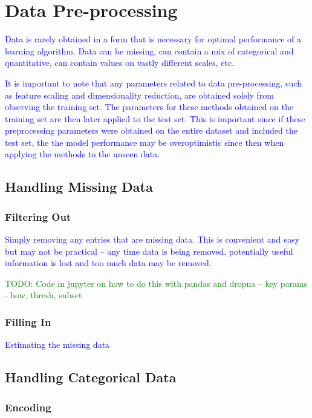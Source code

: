 \section{Data Pre-processing}

\textcolor{blue}{Data is rarely obtained in a form that is necessary for optimal performance of a learning algorithm. Data can be missing, can contain a mix of categorical and quantitative, can contain values on vastly different scales, etc.}

\textcolor{blue}{It is important to note that any parameters related to data pre-processing, such as feature scaling and dimensionality reduction, are obtained solely from observing the training set. The parameters for these methods obtained on the training set are then later applied to the test set. This is important since if these preprocessing parameters were obtained on the entire dataset and included the test set, the the model performance may be overoptimistic since then when applying the methods to the unseen data.}

\subsection{Handling Missing Data}

\subsubsection{Filtering Out}

\textcolor{blue}{Simply removing any entries that are missing data. This is convenient and easy but may not be practical -- any time data is being removed, potentially useful information is lost and too much data may be removed.}

\textcolor{green}{TODO: Code in jupyter on how to do this with pandas and dropna -- key params - how, thresh, subset}

\subsubsection{Filling In}

\textcolor{blue}{Estimating the missing data}

\subsection{Handling Categorical Data}



\subsubsection{Encoding}

